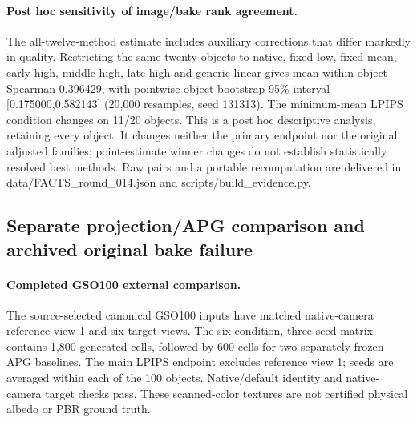 \documentclass[11pt]{article}
\begin{document}
\paragraph{Post hoc sensitivity of image/bake rank agreement.}
The all-twelve-method estimate includes auxiliary corrections that differ markedly in quality. Restricting the same twenty objects to native, fixed low, fixed mean, early-high, middle-high, late-high and generic linear gives mean within-object Spearman 0.396429, with pointwise object-bootstrap 95\% interval [0.175000,0.582143] (20,000 resamples, seed 131313). The minimum-mean LPIPS condition changes on 11/20 objects. This is a post hoc descriptive analysis, retaining every object. It changes neither the primary endpoint nor the original adjusted families; point-estimate winner changes do not establish statistically resolved best methods. Raw pairs and a portable recomputation are delivered in data/FACTS\_round\_014.json and scripts/build\_evidence.py.

\subsection*{Separate projection/APG comparison and archived original bake failure}
\paragraph{Completed GSO100 external comparison.}
The source-selected canonical GSO100 inputs have matched native-camera reference view 1 and six target views. The six-condition, three-seed matrix contains 1,800 generated cells, followed by 600 cells for two separately frozen APG baselines. The main LPIPS endpoint excludes reference view 1; seeds are averaged within each of the 100 objects. Native/default identity and native-camera target checks pass. These scanned-color textures are not certified physical albedo or PBR ground truth.
\end{document}
